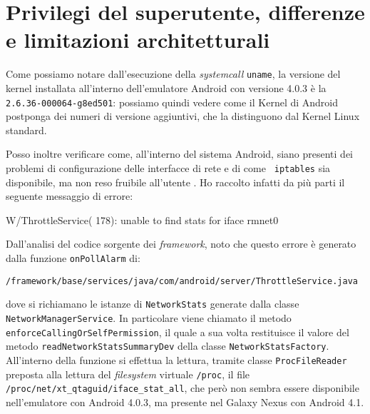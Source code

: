 \section{Privilegi del superutente, differenze e limitazioni architetturali}\label{sec:rivsupuser}
Come possiamo notare dall'esecuzione della \textit{systemcall} \texttt{\small uname},
la versione del kernel installata all'interno dell'emulatore Android con 
versione 4.0.3 è la \texttt{\small 2.6.36-000064-g8ed501}: possiamo quindi
vedere come il Kernel di Android postponga dei numeri di versione aggiuntivi,
che la distinguono dal Kernel Linux standard.
\medskip

Posso inoltre verificare come, all'interno del sistema Android, siano presenti
dei problemi di configurazione delle interfacce di rete e di come \texttt{\small
iptables} sia disponibile, ma non reso fruibile all'utente \parencite{site:marakAndroidInternals}. 
Ho raccolto infatti da più parti il seguente messaggio di errore:
\begin{bash}
W/ThrottleService(  178): unable to find stats for iface rmnet0
\end{bash}

Dall'analisi del codice sorgente dei \textit{framework}, noto che questo errore è 
generato dalla funzione \texttt{\small onPollAlarm} di:
\begin{center}
\AOSP\texttt{\small/framework/base/services/java/com/android/server/ThrottleService.java}
\end{center} 
dove si richiamano le istanze di \texttt{\small NetworkStats} generate dalla classe 
\texttt{\small NetworkManagerService}. In particolare viene chiamato il metodo
 \texttt{\small enforceCallingOrSelfPermission}, il quale a sua volta restituisce 
 il valore del metodo \texttt{\small readNetworkStatsSummaryDev} della classe 
 \texttt{\small NetworkStatsFactory}. All'interno della funzione si effettua la lettura, 
 tramite classe \texttt{\small ProcFileReader} preposta alla lettura del \textit{filesystem}
 virtuale \texttt{\small /proc}, il file \texttt{\small /proc/net/xt\_qtaguid/iface\_stat\_all},
 che però non sembra essere disponibile nell'emulatore con Android 4.0.3, 
 ma presente nel Galaxy Nexus con Android 4.1.
 
